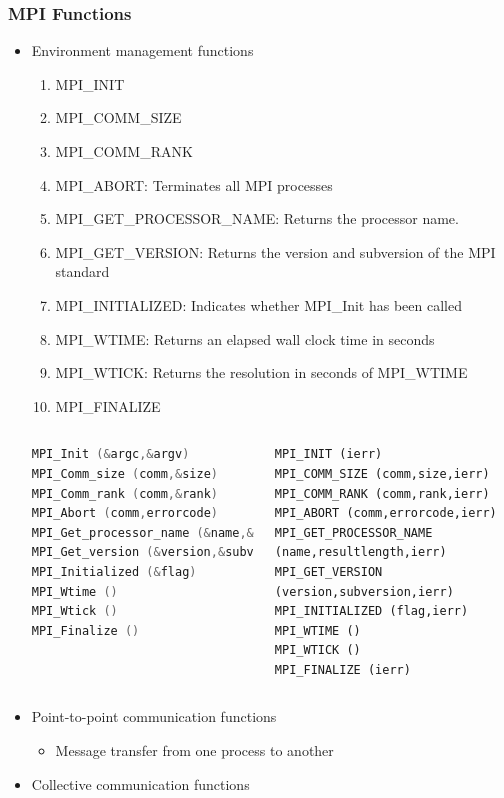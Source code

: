 \documentclass[10pt,t]{beamer}
\begin{document}
\begin{frame}
  \frametitle{MPI Functions}
  \begin{itemize}
  \item Environment management functions
    \begin{enumerate}
    \item MPI\_INIT
    \item MPI\_COMM\_SIZE
    \item MPI\_COMM\_RANK
    \item MPI\_ABORT: Terminates all MPI processes
    \item MPI\_GET\_PROCESSOR\_NAME: Returns the processor name.
    \item MPI\_GET\_VERSION: Returns the version and subversion of the MPI standard
    \item MPI\_INITIALIZED: Indicates whether MPI\_Init has been called
    \item MPI\_WTIME: Returns an elapsed wall clock time in seconds
    \item MPI\_WTICK: Returns the resolution in seconds of MPI\_WTIME
    \item MPI\_FINALIZE
    \end{enumerate}
    \begin{columns}
      \begin{lstlisting}[language=C]
MPI_Init (&argc,&argv) 
MPI_Comm_size (comm,&size) 
MPI_Comm_rank (comm,&rank) 
MPI_Abort (comm,errorcode)
MPI_Get_processor_name (&name,&resultlength)
MPI_Get_version (&version,&subversion)
MPI_Initialized (&flag) 
MPI_Wtime ()
MPI_Wtick ()
MPI_Finalize ()
      \end{lstlisting}
      \begin{lstlisting}[language={[90]Fortran}]
MPI_INIT (ierr)
MPI_COMM_SIZE (comm,size,ierr)
MPI_COMM_RANK (comm,rank,ierr)
MPI_ABORT (comm,errorcode,ierr)
MPI_GET_PROCESSOR_NAME (name,resultlength,ierr)
MPI_GET_VERSION (version,subversion,ierr)
MPI_INITIALIZED (flag,ierr)
MPI_WTIME ()
MPI_WTICK ()
MPI_FINALIZE (ierr)
      \end{lstlisting}
    \end{columns}
    \framebreak
  \item Point-to-point communication functions
    \begin{itemize}
    \item Message transfer from one process to another
    \end{itemize}
  \item Collective communication functions 

\end{itemize}
\end{frame}
\end{document}
